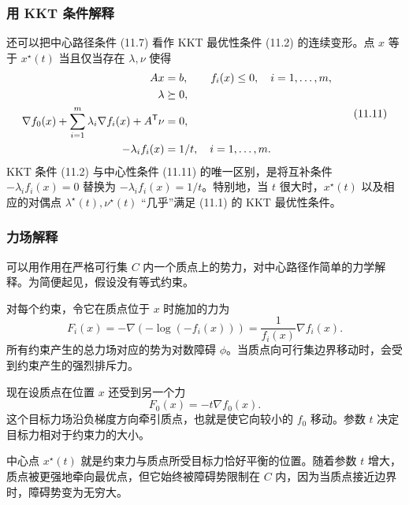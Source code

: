 \subsubsection*{用 KKT 条件解释}
还可以把中心路径条件 (11.7) 看作 KKT 最优性条件 (11.2) 的连续变形。点 $x$ 等于 $x^\star(t)$ 当且仅当存在 $\lambda,\nu$ 使得
\begin{equation}\begin{aligned}
Ax&=b,\qquad f_i(x)\le0,\quad i=1,\ldots,m,\\
\lambda&\succeq0,\\
\nabla f_0(x)+\sum_{i=1}^m\lambda_i\nabla f_i(x)+A^\mathsf T\nu&=0,\\
-\lambda_i f_i(x)&=1/t,\quad i=1,\ldots,m.
\end{aligned}\tag{11.11}\end{equation}
KKT 条件 (11.2) 与中心性条件 (11.11) 的唯一区别，是将互补条件 $-\lambda_i f_i(x)=0$ 替换为 $-\lambda_i f_i(x)=1/t$。特别地，当 $t$ 很大时，$x^\star(t)$ 以及相应的对偶点 $\lambda^\star(t),\nu^\star(t)$ “几乎”满足 (11.1) 的 KKT 最优性条件。

\subsubsection*{力场解释}
可以用作用在严格可行集 $C$ 内一个质点上的势力，对中心路径作简单的力学解释。为简便起见，假设没有等式约束。

对每个约束，令它在质点位于 $x$ 时施加的力为
\[
F_i(x)=-\nabla(-\log(-f_i(x)))=\frac1{f_i(x)}\nabla f_i(x).
\]
所有约束产生的总力场对应的势为对数障碍 $\phi$。当质点向可行集边界移动时，会受到约束产生的强烈排斥力。

现在设质点在位置 $x$ 还受到另一个力
\[
F_0(x)=-t\nabla f_0(x).
\]
这个目标力场沿负梯度方向牵引质点，也就是使它向较小的 $f_0$ 移动。参数 $t$ 决定目标力相对于约束力的大小。

中心点 $x^\star(t)$ 就是约束力与质点所受目标力恰好平衡的位置。随着参数 $t$ 增大，质点被更强地牵向最优点，但它始终被障碍势限制在 $C$ 内，因为当质点接近边界时，障碍势变为无穷大。

